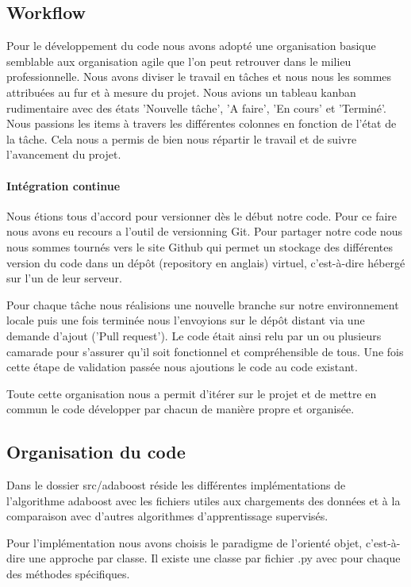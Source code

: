 \documentclass{article}
\begin{document}
\subsection{Workflow}

Pour le développement du code nous avons adopté une organisation basique semblable aux organisation agile que l'on peut retrouver dans le milieu professionnelle. 
Nous avons diviser le travail en tâches et nous nous les sommes attribuées au fur et à mesure du projet. Nous avions un tableau kanban rudimentaire avec des états 'Nouvelle tâche', 'A faire', 'En cours' et 'Terminé'. Nous passions les items à travers les différentes colonnes en fonction de l'état de la tâche. Cela nous a permis de bien nous répartir le travail et de suivre l'avancement du projet. 

\paragraph{Intégration continue}

Nous étions tous d'accord pour versionner dès le début notre code. Pour ce faire nous avons eu recours a l'outil de versionning Git. 
Pour partager notre code nous nous sommes tournés vers le site Github qui permet un stockage des différentes version du code dans un dépôt (repository en anglais) virtuel, c'est-à-dire hébergé sur l'un de leur serveur.

Pour chaque tâche nous réalisions une nouvelle branche sur notre environnement locale puis une fois terminée nous l'envoyions sur le dépôt distant via une demande d'ajout ('Pull request'). 
Le code était ainsi relu par un ou plusieurs camarade pour s'assurer qu'il soit fonctionnel et compréhensible de tous. Une fois cette étape de validation passée nous ajoutions le code au code existant. 

Toute cette organisation nous a permit d'itérer sur le projet et de mettre en commun le code développer par chacun de manière propre et organisée. 

\subsection{Organisation du code}

Dans le dossier src/adaboost réside les différentes implémentations de l'algorithme adaboost avec les fichiers utiles aux chargements des données et à la comparaison avec d'autres algorithmes d'apprentissage supervisés.

Pour l'implémentation nous avons choisis le paradigme de l'orienté objet, c'est-à-dire une approche par classe. Il existe une classe par fichier .py avec pour chaque des méthodes spécifiques. 
\end{document}
